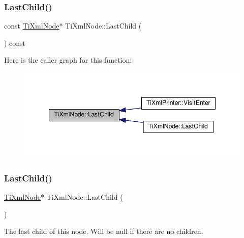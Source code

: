 \subsubsection{\texorpdfstring{Last\+Child()}{LastChild()}\hspace{0.1cm}{\footnotesize\ttfamily [1/4]}}
{\footnotesize\ttfamily const \hyperlink{class_ti_xml_node}{Ti\+Xml\+Node}$\ast$ Ti\+Xml\+Node\+::\+Last\+Child (\begin{DoxyParamCaption}{ }\end{DoxyParamCaption}) const\hspace{0.3cm}{\ttfamily [inline]}}

Here is the caller graph for this function\+:
\nopagebreak
\begin{figure}[H]
\begin{center}
\leavevmode
\includegraphics[width=348pt]{class_ti_xml_node_af3a04120b1ed2fead2f4bb72cbea845e_icgraph}
\end{center}
\end{figure}
\mbox{\label{class_ti_xml_node_a6432d2b2495f6caf9cb4278df706a031}} 
\subsubsection{\texorpdfstring{Last\+Child()}{LastChild()}\hspace{0.1cm}{\footnotesize\ttfamily [2/4]}}
{\footnotesize\ttfamily \hyperlink{class_ti_xml_node}{Ti\+Xml\+Node}$\ast$ Ti\+Xml\+Node\+::\+Last\+Child (\begin{DoxyParamCaption}{ }\end{DoxyParamCaption})\hspace{0.3cm}{\ttfamily [inline]}}



The last child of this node. Will be null if there are no children. 

